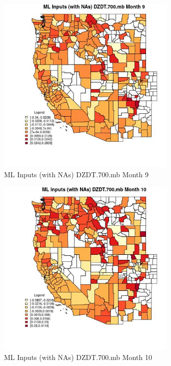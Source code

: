 \begin{figure} 
\centering  
\includegraphics[width=0.77\textwidth]{Code_Outputs/Report_ML_input_PM25_Step4_part_e_de_duplicated_aves_compiled_2019-05-21wNAs_CountyDZDT700mbmedianMonth9.jpg} 
\caption{\label{fig:Report_ML_input_PM25_Step4_part_e_de_duplicated_aves_compiled_2019-05-21wNAsCountyDZDT700mbmedianMonth9}ML Inputs (with NAs) DZDT.700.mb Month 9} 
\end{figure} 
 

\begin{figure} 
\centering  
\includegraphics[width=0.77\textwidth]{Code_Outputs/Report_ML_input_PM25_Step4_part_e_de_duplicated_aves_compiled_2019-05-21wNAs_CountyDZDT700mbmedianMonth10.jpg} 
\caption{\label{fig:Report_ML_input_PM25_Step4_part_e_de_duplicated_aves_compiled_2019-05-21wNAsCountyDZDT700mbmedianMonth10}ML Inputs (with NAs) DZDT.700.mb Month 10} 
\end{figure} 
 

